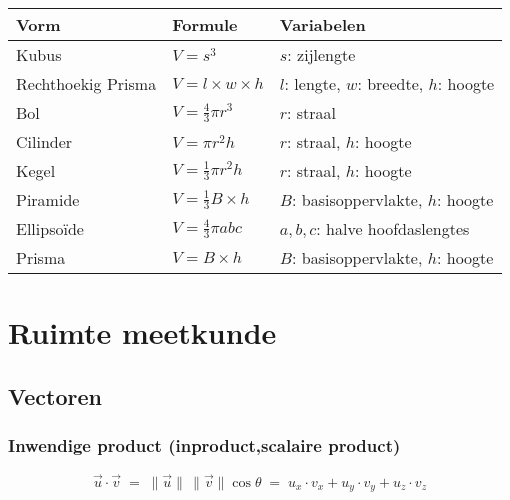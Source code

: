 \documentclass[a5paper]{article}
\begin{document}
\begin{table}[h!]
\begin{tabular}{|l|l|l|}
\hline
\textbf{Vorm} & \textbf{Formule} & \textbf{Variabelen} \\
\hline
Kubus & $V = s^3$ & $s$: zijlengte \\
\hline
Rechthoekig Prisma & $V = l \times w \times h$ & $l$: lengte, $w$: breedte, $h$: hoogte \\
\hline
Bol & $V = \frac{4}{3} \pi r^3$ & $r$: straal \\
\hline
Cilinder & $V = \pi r^2 h$ & $r$: straal, $h$: hoogte \\
\hline
Kegel & $V = \frac{1}{3} \pi r^2 h$ & $r$: straal, $h$: hoogte \\
\hline
Piramide & $V = \frac{1}{3} B \times h$ & $B$: basisoppervlakte, $h$: hoogte \\
\hline
Ellipsoïde & $V = \frac{4}{3} \pi a b c$ & $a, b, c$: halve hoofdaslengtes \\
\hline
Prisma & $V = B \times h$ & $B$: basisoppervlakte, $h$: hoogte \\
\hline
\end{tabular}
\end{table}

\newpage

\section{Ruimte meetkunde}
\subsection{Vectoren}
\subsubsection{Inwendige product (inproduct,scalaire product)}
\begin{center}
\end{center}
\[
\vec u \cdot \vec v \;=\; \|\vec u\|\,\|\vec v\| \cos\theta \;=\; u_x \cdot v_x + u_y \cdot v_y + u_z \cdot v_z
\]
\end{document}
